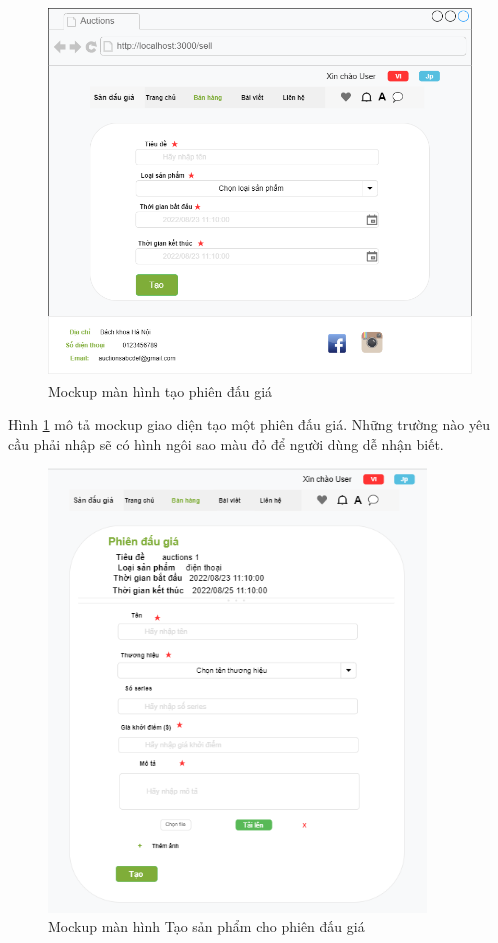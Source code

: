\documentclass[../DoAn.tex]{subfiles}
\begin{document}
\begin{figure}[H]
    \centering
    \includegraphics[width=11.43cm,height=9.87cm]{Hinhve/createauction.png}
    \caption{Mockup màn hình tạo phiên đấu giá}
    \label{fig:Fig49}
\end{figure}
Hình \ref{fig:Fig49} mô tả mockup giao diện tạo một phiên đấu giá. Những trường nào yêu cầu phải nhập sẽ có hình ngôi sao màu đỏ để người dùng dễ nhận biết.
\begin{figure}[H]
    \centering
    \includegraphics[width=10.04cm,height=11.76cm]{Hinhve/itemcreate.png}
    \caption{Mockup màn hình Tạo sản phẩm cho phiên đấu giá}
    \label{fig:Fig410}
\end{figure}
\end{document}
